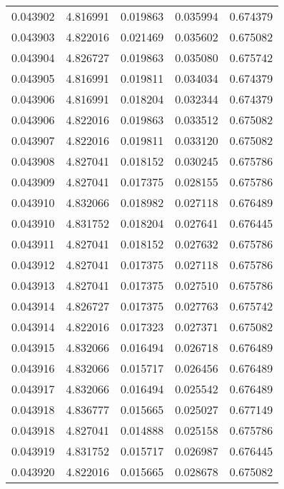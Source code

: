 \begin{tabular}{lrrrr}
0.043902    &  4.816991 &  0.019863 &  0.035994 &             0.674379 \\
0.043903    &  4.822016 &  0.021469 &  0.035602 &             0.675082 \\
0.043904    &  4.826727 &  0.019863 &  0.035080 &             0.675742 \\
0.043905    &  4.816991 &  0.019811 &  0.034034 &             0.674379 \\
0.043906    &  4.816991 &  0.018204 &  0.032344 &             0.674379 \\
0.043906    &  4.822016 &  0.019863 &  0.033512 &             0.675082 \\
0.043907    &  4.822016 &  0.019811 &  0.033120 &             0.675082 \\
0.043908    &  4.827041 &  0.018152 &  0.030245 &             0.675786 \\
0.043909    &  4.827041 &  0.017375 &  0.028155 &             0.675786 \\
0.043910    &  4.832066 &  0.018982 &  0.027118 &             0.676489 \\
0.043910    &  4.831752 &  0.018204 &  0.027641 &             0.676445 \\
0.043911    &  4.827041 &  0.018152 &  0.027632 &             0.675786 \\
0.043912    &  4.827041 &  0.017375 &  0.027118 &             0.675786 \\
0.043913    &  4.827041 &  0.017375 &  0.027510 &             0.675786 \\
0.043914    &  4.826727 &  0.017375 &  0.027763 &             0.675742 \\
0.043914    &  4.822016 &  0.017323 &  0.027371 &             0.675082 \\
0.043915    &  4.832066 &  0.016494 &  0.026718 &             0.676489 \\
0.043916    &  4.832066 &  0.015717 &  0.026456 &             0.676489 \\
0.043917    &  4.832066 &  0.016494 &  0.025542 &             0.676489 \\
0.043918    &  4.836777 &  0.015665 &  0.025027 &             0.677149 \\
0.043918    &  4.827041 &  0.014888 &  0.025158 &             0.675786 \\
0.043919    &  4.831752 &  0.015717 &  0.026987 &             0.676445 \\
0.043920    &  4.822016 &  0.015665 &  0.028678 &             0.675082 \\

\end{tabular}
